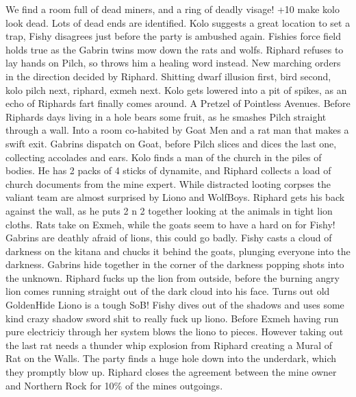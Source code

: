 We find a room full of dead miners, and a ring of deadly visage! +10 make kolo look dead. Lots of dead ends are identified.\medskip
Kolo suggests a great location to set a trap, Fishy disagrees just before the party is ambushed again. Fishies force field holds true as the Gabrin twins mow down the rats and wolfs. Riphard refuses to lay hands on Pilch, so throws him a healing word instead.\medskip
New marching orders in the direction decided by Riphard. Shitting dwarf illusion first, bird second, kolo pilch next, riphard, exmeh next.\medskip
Kolo gets lowered into a pit of spikes, as an echo of Riphards fart finally comes around. A Pretzel of Pointless Avenues. Before Riphards days living in a hole bears some fruit, as he smashes Pilch straight through a wall. Into a room co-habited by Goat Men and a rat man that makes a swift exit. Gabrins dispatch on Goat, before Pilch slices and dices the last one, collecting accolades and ears.\medskip
Kolo finds a man of the church in the piles of bodies. He has 2 packs of 4 sticks of dynamite, and Riphard collects a load of church documents from the mine expert.\medskip
While distracted looting corpses the valiant team are almost surprised by Liono and WolfBoys. Riphard gets his back against the wall, as he puts 2 n 2 together looking at the animals in tight lion cloths. Rats take on Exmeh, while the goats seem to have a hard on for Fishy! Gabrins are deathly afraid of lions, this could go badly.\medskip
Fishy casts a cloud of darkness on the kitana and chucks it behind the goats, plunging everyone into the darkness. Gabrins hide together in the corner of the darkness popping shots into the unknown. Riphard fucks up the lion from outside, before the burning angry lion comes running straight out of the dark cloud into his face. Turns out old GoldenHide Liono is a tough SoB! Fishy dives out of the shadows and uses some kind crazy shadow sword shit to really fuck up liono. Before Exmeh having run pure electriciy through her system blows the liono to pieces.\medskip
However taking out the last rat needs a thunder whip explosion from Riphard creating a Mural of Rat on the Walls.\medskip
The party finds a huge hole down into the underdark, which they promptly blow up.\medskip
Riphard closes the agreement between the mine owner and Northern Rock for 10\% of the mines outgoings.